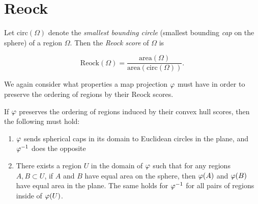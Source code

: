 \section{Reock}\label{sec:reock}

Let $\mathrm{circ}(\Omega)$ denote the \textit{smallest bounding
circle} (smallest bounding \textit{cap} on the sphere) of a region
$\Omega$.  Then the \textit{Reock score} of $\Omega$ is 

$$\mathrm{Reock}(\Omega)=
\frac{\mathrm{area}(\Omega)}{\mathrm{area}(\mathrm{circ}(\Omega))}.$$

We again consider what properties a map projection $\varphi$ must have in order to preserve the ordering of regions by their Reock scores.  
\begin{lemma}\label{lem:reock_prep}
  If $\varphi$ preserves the ordering of regions induced by their convex hull scores, then the following must hold:
  \begin{enumerate}
    \item $\varphi$ sends spherical caps in its domain to Euclidean circles in the plane,  and $\varphi^{-1}$ does the opposite 
    \item There exists a region $U$ in the domain of $\varphi$ such that for any regions $A,B\subset U$, if $A$ and $B$ have equal area on the sphere, then $\varphi(A)$ and $\varphi(B)$ have equal area in the plane.  The same holds for $\varphi^{-1}$ for all pairs of regions inside of $\varphi(U)$.
  \end{enumerate}
\end{lemma}
